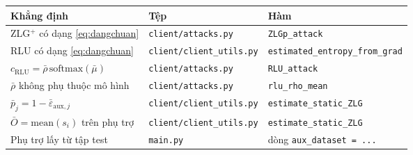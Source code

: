 \documentclass[11pt,a4paper]{article}
\theoremstyle{remark}
\newcommand{\code}[1]{\texttt{\small #1}}
\begin{document}
\begin{center}
\begin{tabular}{@{}lll@{}}
\toprule
\textbf{Khẳng định} & \textbf{Tệp} & \textbf{Hàm} \\
\midrule
ZLG$^+$ có dạng \eqref{eq:dangchuan} & \code{client/attacks.py} & \code{ZLGp\_attack} \\
RLU có dạng \eqref{eq:dangchuan} & \code{client/client\_utils.py} & \code{estimated\_entropy\_from\_grad} \\
$c_{\text{RLU}}=\bar\rho\,\mathrm{softmax}(\bar\mu)$ & \code{client/attacks.py} & \code{RLU\_attack} \\
$\bar\rho$ không phụ thuộc mô hình & \code{client/attacks.py} & \code{rlu\_rho\_mean} \\
$\bar p_j=1-\bar\varepsilon_{\mathrm{aux},j}$ & \code{client/client\_utils.py} & \code{estimate\_static\_ZLG} \\
$\bar O=\mathrm{mean}(s_i)$ trên phụ trợ & \code{client/client\_utils.py} & \code{estimate\_static\_ZLG} \\
Phụ trợ lấy từ tập test & \code{main.py} & dòng \code{aux\_dataset = ...} \\
\bottomrule
\end{tabular}
\end{center}
\end{document}
